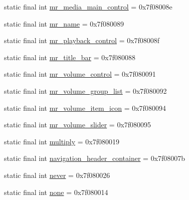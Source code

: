 \begin{CompactItemize}
\item 
static final int \hyperlink{classandroid_1_1support_1_1graphics_1_1drawable_1_1animated_1_1_r_1_1id_1f136771b34ab36a35e3a79e4a886583}{mr\_\-media\_\-main\_\-control} = 0x7f08008e
\item 
static final int \hyperlink{classandroid_1_1support_1_1graphics_1_1drawable_1_1animated_1_1_r_1_1id_c086ed9b3439a286a1033687850fb827}{mr\_\-name} = 0x7f080089
\item 
static final int \hyperlink{classandroid_1_1support_1_1graphics_1_1drawable_1_1animated_1_1_r_1_1id_bf2cca1593f0f498be51ff599f73d41d}{mr\_\-playback\_\-control} = 0x7f08008f
\item 
static final int \hyperlink{classandroid_1_1support_1_1graphics_1_1drawable_1_1animated_1_1_r_1_1id_8a4318dd99e495d4c4f064d5fb30bbb5}{mr\_\-title\_\-bar} = 0x7f080088
\item 
static final int \hyperlink{classandroid_1_1support_1_1graphics_1_1drawable_1_1animated_1_1_r_1_1id_6bd5e369c7fcf91588a2e175e9ae6d8e}{mr\_\-volume\_\-control} = 0x7f080091
\item 
static final int \hyperlink{classandroid_1_1support_1_1graphics_1_1drawable_1_1animated_1_1_r_1_1id_04b1cbfafeb365460df984408c8962b8}{mr\_\-volume\_\-group\_\-list} = 0x7f080092
\item 
static final int \hyperlink{classandroid_1_1support_1_1graphics_1_1drawable_1_1animated_1_1_r_1_1id_ab2d1c3e41a3a323f0649766a3d283fe}{mr\_\-volume\_\-item\_\-icon} = 0x7f080094
\item 
static final int \hyperlink{classandroid_1_1support_1_1graphics_1_1drawable_1_1animated_1_1_r_1_1id_96f30bef9772921d544348d8d634299c}{mr\_\-volume\_\-slider} = 0x7f080095
\item 
static final int \hyperlink{classandroid_1_1support_1_1graphics_1_1drawable_1_1animated_1_1_r_1_1id_0446425119a89157b176f6dcc37587a6}{multiply} = 0x7f080019
\item 
static final int \hyperlink{classandroid_1_1support_1_1graphics_1_1drawable_1_1animated_1_1_r_1_1id_c730bf62deeeb3c783b36ceac94d832c}{navigation\_\-header\_\-container} = 0x7f08007b
\item 
static final int \hyperlink{classandroid_1_1support_1_1graphics_1_1drawable_1_1animated_1_1_r_1_1id_e0fdaed641cb35a600bd33aee96e221e}{never} = 0x7f080026
\item 
static final int \hyperlink{classandroid_1_1support_1_1graphics_1_1drawable_1_1animated_1_1_r_1_1id_f14b14c2a10da3754d1a894969962d1e}{none} = 0x7f080014
\item 

\end{CompactItemize}
